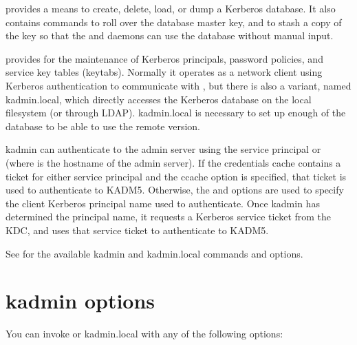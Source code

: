 \documentclass[letterpaper,10pt,english]{sphinxmanual}
\begin{document}
{\hyperref[\detokenize{admin/admin_commands/kdb5_util:kdb5-util-8}]{}} provides a means to create, delete, load, or dump
a Kerberos database.  It also contains commands to roll over the
database master key, and to stash a copy of the key so that the
{\hyperref[\detokenize{admin/admin_commands/kadmind:kadmind-8}]{}} and {\hyperref[\detokenize{admin/admin_commands/krb5kdc:krb5kdc-8}]{}} daemons can use the database
without manual input.

{\hyperref[\detokenize{admin/admin_commands/kadmin_local:kadmin-1}]{}} provides for the maintenance of Kerberos principals,
password policies, and service key tables (keytabs).  Normally it
operates as a network client using Kerberos authentication to
communicate with {\hyperref[\detokenize{admin/admin_commands/kadmind:kadmind-8}]{}}, but there is also a variant, named
kadmin.local, which directly accesses the Kerberos database on the
local filesystem (or through LDAP).  kadmin.local is necessary to set
up enough of the database to be able to use the remote version.

kadmin can authenticate to the admin server using the service
principal  or  (where  is the
hostname of the admin server).  If the credentials cache contains a
ticket for either service principal and the  ccache option is
specified, that ticket is used to authenticate to KADM5.  Otherwise,
the  and  options are used to specify the client Kerberos
principal name used to authenticate.  Once kadmin has determined the
principal name, it requests a  Kerberos service ticket
from the KDC, and uses that service ticket to authenticate to KADM5.

See {\hyperref[\detokenize{admin/admin_commands/kadmin_local:kadmin-1}]{}} for the available kadmin and kadmin.local
commands and options.


\section{kadmin options}
\label{\detokenize{admin/database:kadmin-options}}
You can invoke {\hyperref[\detokenize{admin/admin_commands/kadmin_local:kadmin-1}]{}} or kadmin.local with any of the
following options:
\end{document}
